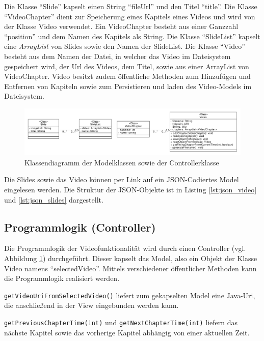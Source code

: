 Die Klasse \enquote{Slide} kapselt einen String \enquote{fileUrl} und den Titel \enquote{title}. 
Die Klasse \enquote{VideoChapter} dient zur Speicherung eines Kapitels eines Videos und wird von der Klasse Video verwendet. Ein VideoChapter besteht aus einer Ganzzahl \enquote{position} und dem Namen des Kapitels als String. Die Klasse \enquote{SlideList} kapselt eine \emph{ArrayList} von Slides sowie den Namen der SlideList.
Die Klasse \enquote{Video} besteht aus dem Namen der Datei, in welcher das Video im Dateisystem gespeichert wird, der Url des Videos, dem Titel, sowie aus einer ArrayList von VideoChapter. Video besitzt zudem öffentliche Methoden zum Hinzufügen und Entfernen von Kapiteln sowie zum Persistieren und laden des Video-Models im Dateisystem.
\begin{figure}[htbp]
    \centering
    \includegraphics[width=1\textwidth]{data/bilder/Klassendiagramm.pdf}
    \caption{Klassendiagramm der Modelklassen sowie der Controllerklasse}
    \label{fig:Klassendiagramm}
\end{figure}

Die Slides sowie das Video können per Link auf ein JSON-Codiertes Model eingelesen werden. Die Struktur der JSON-Objekte ist in Listing \ref{lst:json_video} und \ref{lst:json_slides} dargestellt.
%
%
\subsection{Programmlogik (Controller)}
Die Programmlogik der Videofunktionalität wird durch einen Controller (vgl. Abbildung \ref{fig:Klassendiagramm}) durchgeführt. Dieser kapselt das Model, also ein Objekt der Klasse Video namens \enquote{selectedVideo}. Mittels verschiedener öffentlicher Methoden kann die Programmlogik realisiert werden. 

\texttt{getVideoUriFromSelectedVideo()} liefert zum gekapselten Model eine Java-Uri, die anschließend in der View eingebunden werden kann.

\texttt{getPreviousChapterTime(int)} und \texttt{getNextChapterTime(int)} liefern das nächste Kapitel sowie das vorherige Kapitel abhängig von einer aktuellen Zeit. 

